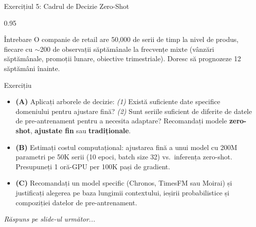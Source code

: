\documentclass[9pt, aspectratio=169, t]{beamer}
\begin{document}
\begin{frame}{Exercițiul 5: Cadrul de Decizie Zero-Shot}
    \begin{cminipage}{0.95\textwidth}
    {\scriptsize
    \begin{alertblock}{Întrebare}
        O companie de retail are 50{,}000 de serii de timp la nivel de produs, fiecare cu $\sim$200 de observații săptămânale la frecvențe mixte (vânzări săptămânale, promoții lunare, obiective trimestriale). Doresc să prognozeze 12 săptămâni înainte.
    \end{alertblock}

    \vspace{0.1cm}

    \begin{block}{Exercițiu}
        \begin{itemize}\setlength{\itemsep}{3pt}
            \item \textcolor{MainBlue}{\textbf{(A)}} Aplicați arborele de decizie: \textit{(1)} Există suficiente date specifice domeniului pentru ajustare fină? \textit{(2)} Sunt seriile suficient de diferite de datele de pre-antrenament pentru a necesita adaptare? Recomandați modele \textbf{zero-shot}, \textbf{ajustate fin} sau \textbf{tradiționale}.
            \item \textcolor{MainBlue}{\textbf{(B)}} Estimați costul computațional: ajustarea fină a unui model cu 200M parametri pe 50K serii (10 epoci, batch size 32) vs.\ inferența zero-shot. Presupuneți 1 oră-GPU per 100K pași de gradient.
            \item \textcolor{MainBlue}{\textbf{(C)}} Recomandați un model specific (Chronos, TimesFM sau Moirai) și justificați alegerea pe baza lungimii contextului, ieșirii probabilistice și compoziției datelor de pre-antrenament.
        \end{itemize}
    \end{block}

    \vspace{0.1cm}

    \begin{center}
        \textit{Răspuns pe slide-ul următor...}
    \end{center}
    }
    \end{cminipage}
\end{frame}
\end{document}
